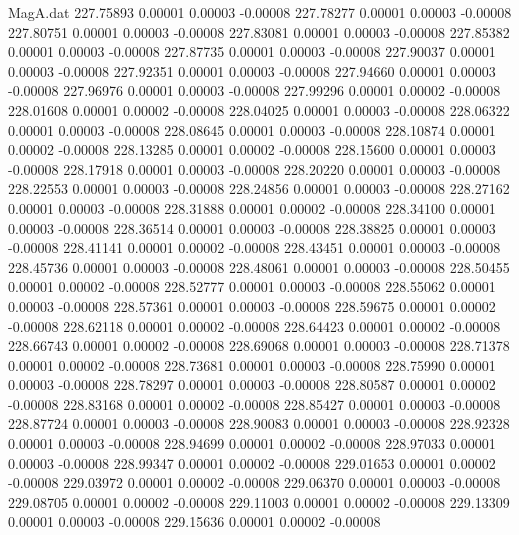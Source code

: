 \begin{filecontents}{MagA.dat}
 227.75893    0.00001    0.00003   -0.00008
 227.78277    0.00001    0.00003   -0.00008
 227.80751    0.00001    0.00003   -0.00008
 227.83081    0.00001    0.00003   -0.00008
 227.85382    0.00001    0.00003   -0.00008
 227.87735    0.00001    0.00003   -0.00008
 227.90037    0.00001    0.00003   -0.00008
 227.92351    0.00001    0.00003   -0.00008
 227.94660    0.00001    0.00003   -0.00008
 227.96976    0.00001    0.00003   -0.00008
 227.99296    0.00001    0.00002   -0.00008
 228.01608    0.00001    0.00002   -0.00008
 228.04025    0.00001    0.00003   -0.00008
 228.06322    0.00001    0.00003   -0.00008
 228.08645    0.00001    0.00003   -0.00008
 228.10874    0.00001    0.00002   -0.00008
 228.13285    0.00001    0.00002   -0.00008
 228.15600    0.00001    0.00003   -0.00008
 228.17918    0.00001    0.00003   -0.00008
 228.20220    0.00001    0.00003   -0.00008
 228.22553    0.00001    0.00003   -0.00008
 228.24856    0.00001    0.00003   -0.00008
 228.27162    0.00001    0.00003   -0.00008
 228.31888    0.00001    0.00002   -0.00008
 228.34100    0.00001    0.00003   -0.00008
 228.36514    0.00001    0.00003   -0.00008
 228.38825    0.00001    0.00003   -0.00008
 228.41141    0.00001    0.00002   -0.00008
 228.43451    0.00001    0.00003   -0.00008
 228.45736    0.00001    0.00003   -0.00008
 228.48061    0.00001    0.00003   -0.00008
 228.50455    0.00001    0.00002   -0.00008
 228.52777    0.00001    0.00003   -0.00008
 228.55062    0.00001    0.00003   -0.00008
 228.57361    0.00001    0.00003   -0.00008
 228.59675    0.00001    0.00002   -0.00008
 228.62118    0.00001    0.00002   -0.00008
 228.64423    0.00001    0.00002   -0.00008
 228.66743    0.00001    0.00002   -0.00008
 228.69068    0.00001    0.00003   -0.00008
 228.71378    0.00001    0.00002   -0.00008
 228.73681    0.00001    0.00003   -0.00008
 228.75990    0.00001    0.00003   -0.00008
 228.78297    0.00001    0.00003   -0.00008
 228.80587    0.00001    0.00002   -0.00008
 228.83168    0.00001    0.00002   -0.00008
 228.85427    0.00001    0.00003   -0.00008
 228.87724    0.00001    0.00003   -0.00008
 228.90083    0.00001    0.00003   -0.00008
 228.92328    0.00001    0.00003   -0.00008
 228.94699    0.00001    0.00002   -0.00008
 228.97033    0.00001    0.00003   -0.00008
 228.99347    0.00001    0.00002   -0.00008
 229.01653    0.00001    0.00002   -0.00008
 229.03972    0.00001    0.00002   -0.00008
 229.06370    0.00001    0.00003   -0.00008
 229.08705    0.00001    0.00002   -0.00008
 229.11003    0.00001    0.00002   -0.00008
 229.13309    0.00001    0.00003   -0.00008
 229.15636    0.00001    0.00002   -0.00008

\end{filecontents}
